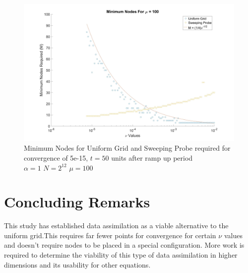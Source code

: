 \documentclass[12pt]{amsart}
\theoremstyle{plain}
\theoremstyle{definition}
\theoremstyle{remark}
\numberwithin{equation}{section} %
\numberwithin{figure}{section}   %
\begin{document}
\begin{figure}
	\includegraphics[scale=0.15]{Minimum}
	\caption{Minimum Nodes for Uniform Grid and Sweeping Probe required for convergence of 5e-15, $t=50$ units after ramp up period \\$\alpha = 1$ $N  =2^{12}$ $\mu = 100$ }
	\label{fig:min}
\end{figure}

\section{Concluding Remarks}
This study has established data assimilation as a viable alternative to the uniform grid.This requires far fewer points for convergence for certain $\nu$ values and doesn't require nodes to be placed in a special configuration. More work is required to determine the viability of this type of data assimilation in higher dimensions and its usability for other equations. 
\clearpage
% 
%



\end{document}
